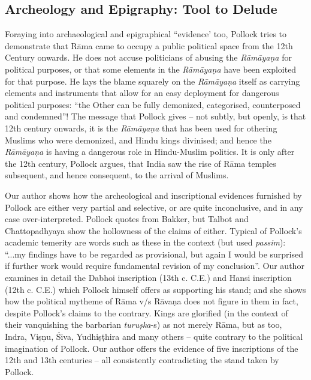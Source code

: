 \subsection*{Archeology and Epigraphy: Tool to Delude}

Foraying into archaeological and epigraphical “evidence’ too, Pollock tries to demonstrate that Rāma came to occupy a public political space from the 12th Century onwards. He does not accuse politicians of abusing the {\sl Rāmāyaṇa} for political purposes, or that some elements in the {\sl Rāmāyaṇa} have been exploited for that purpose. He lays the blame squarely on the {\sl Rāmāyaṇa} itself as carrying elements and instruments that allow for an easy deployment for dangerous political purposes: “the Other can be fully demonized, categorised, counterposed and condemned”! The message that Pollock gives -- not subtly, but openly, is that 12th century onwards, it is the {\sl Rāmāyaṇa} that has been used for othering Muslims who were demonized, and Hindu kings divinised; and hence the {\sl Rāmāyaṇa} is having a dangerous role in Hindu-Muslim politics. It is only after the 12th century, Pollock argues, that India saw the rise of Rāma temples subsequent, and hence consequent, to the arrival of Muslims.

Our author shows how the archeological and inscriptional evidences furnished by Pollock are either very partial and selective, or are quite inconclusive, and in any case over-interpreted. Pollock quotes from Bakker, but Talbot and Chattopadhyaya show the hollowness of the claims of either. Typical of Pollock’s academic temerity are words such as these in the context (but used {\sl passim}): “...my findings have to be regarded as provisional, but again I would be surprised if further work would require fundamental revision of my conclusion”. Our author examines in detail the Dabhoi inscription (13th c. C.E.) and Hansi inscription (12th c. C.E.) which Pollock himself offers as supporting his stand; and she shows how the political mytheme of Rāma v/s Rāvaṇa does not figure in them in fact, despite Pollock's claims to the contrary. Kings are glorified (in the context of their vanquishing the barbarian {\sl turuṣka}-s) as not merely Rāma, but as too, Indra, Viṣṇu, Śiva, Yudhiṣṭhira and many others -- quite contrary to the political imagination of Pollock. Our author offers the evidence of five inscriptions of the 12th and 13th centuries -- all consistently contradicting the stand taken by Pollock.\\[-12pt]

